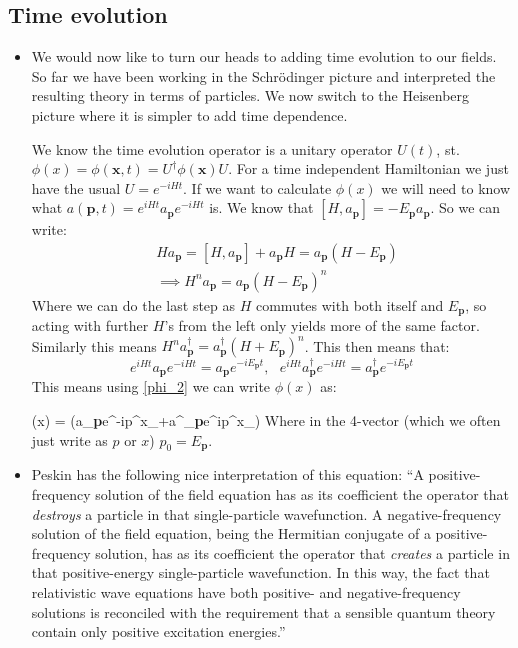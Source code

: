 \documentclass[11pt]{article}
\renewenvironment{flalign}{\vspace{-3mm}\empheq[box=\tcbhighmath]{align}}{\endempheq}
\numberwithin{equation}{section}
\begin{document}
\subsection{Time evolution}
\begin{itemize}
  \item We would now like to turn our heads to adding time evolution to our fields. So far we have been working in the Schr\"odinger picture and interpreted the resulting theory in terms of particles. We now switch to the Heisenberg picture where it is simpler to add time dependence. 

  We know the time evolution operator is a unitary operator $U(t)$, st. $\phi(x) = \phi(\textbf{x},t) = U^{\dagger}\phi(\textbf{x})U$. For a time independent Hamiltonian we just have the usual $U = e^{-iHt}$. If we want to calculate $\phi(x)$ we will need to know what $a(\textbf{p},t) = e^{iHt}a_{\textbf{p}}e^{-iHt}$ is. We know that $[H,a_{\textbf{p}}] = -E_{\textbf{p}}a_{\textbf{p}}$. So we can write:
  \begin{equation*}
  \begin{split}
  & Ha_{\textbf{p}} = [H,a_{\textbf{p}}]+a_{\textbf{p}}H = a_{\textbf{p}}(H-E_{\textbf{p}}) \\ 
  & \implies H^na_{\textbf{p}} = a_{\textbf{p}}(H-E_{\textbf{p}})^n
  \end{split} 
  \end{equation*}
  Where we can do the last step as $H$ commutes with both itself and $E_{\textbf{p}}$, so acting with further $H$'s from the left only yields more of the same factor. Similarly this means $H^na^{\dagger}_{\textbf{p}} = a^{\dagger}_{\textbf{p}}(H+E_{\textbf{p}})^n$. This then means that: 
  \[
  e^{iHt}a_{\textbf{p}}e^{-iHt} = a_{\textbf{p}}e^{-iE_{\textbf{p}}t},~~~e^{iHt}a^{\dagger}_{\textbf{p}}e^{-iHt} = a^{\dagger}_{\textbf{p}}e^{-iE_{\textbf{p}}t}
  \]
  This means using \ref{phi_2} we can write $\phi(x)$ as:

  \begin{flalign}
  \label{phi_3}
  \phi(x) = \int {}\left(a_{\textbf{p}}e^{-ip^{\mu}x_{\mu}}+a^{\dagger}_{\textbf{p}}e^{ip^{\mu}x_{\mu}}\right) 
  \end{flalign}
  Where in the 4-vector (which we often just write as $p$ or $x$) $p_{0} = E_{\textbf{p}}$. 

  \item Peskin has the following nice interpretation of this equation: ``A positive-frequency solution of the field equation has as its coefficient the operator that \emph{destroys} a particle in that single-particle wavefunction. A negative-frequency solution of the field equation, being the Hermitian conjugate of a positive-frequency solution, has as its coefficient the operator that \emph{creates} a particle in that positive-energy single-particle wavefunction. In this way, the fact that relativistic wave equations have both positive- and negative-frequency solutions is reconciled with the requirement that a sensible quantum theory contain only positive excitation energies.'' 


\end{itemize}
\end{document}
